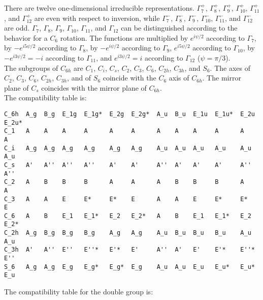 \documentclass[12pt,a4paper,twoside]{report}
\begin{document}
There are twelve one-dimensional irreducible representations. 
$\Gamma_7^+$, $\Gamma_8^+$, $\Gamma_9^+$, $\Gamma_{10}^+$, $\Gamma_{11}^+$,
and $\Gamma_{12}^+$ are even with respect to inversion, while 
$\Gamma_7^-$, $\Gamma_8^-$, $\Gamma_9^-$, $\Gamma_{10}^-$, $\Gamma_{11}^-$,
and $\Gamma_{12}^-$ are odd. $\Gamma_7$, $\Gamma_8$, $\Gamma_9$, 
$\Gamma_{10}$, $\Gamma_{11}$, and $\Gamma_{12}$ can be distinguished
according to the behavior for a $C_6$ rotation.
The functions are multiplied by $e^{i\psi/2}$ according to $\Gamma_7$, 
by $-e^{i5\psi/2}$ according to $\Gamma_8$, by $-e^{i\psi/2}$ according 
to $\Gamma_9$, $e^{i5\psi/2}$ according to $\Gamma_{10}$, by $-e^{i3\psi/2}=-i$ 
according to $\Gamma_{11}$, and $e^{i3\psi/2}=i$ according 
to $\Gamma_{12}$ ($\psi=\pi/3$). \\
The subgroups of $C_{6h}$ are $C_1$, $C_i$, $C_s$, $C_2$, $C_3$, $C_6$, 
$C_{2h}$, $C_{3h}$, and $S_6$. The axes of $C_2$, $C_3$, $C_6$, $C_{2h}$, 
$C_{3h}$, and of $S_6$ coincide with the $C_6$ axis of $C_{6h}$. The mirror 
plane of $C_s$ coincides with the mirror plane of $C_{6h}$.\\
The compatibility table is:
\begin{tcolorbox}
\begin{scriptsize}
\begin{verbatim}
C_6h  A_g  B_g  E_1g  E_1g*  E_2g  E_2g*  A_u  B_u  E_1u  E_1u*  E_2u  E_2u*
C_1   A    A    A     A      A     A      A    A    A     A      A     A
C_i   A_g  A_g  A_g   A_g    A_g   A_g    A_u  A_u  A_u   A_u    A_u   A_u
C_s   A'   A''  A''   A''    A'    A'     A''  A'   A'    A'     A''   A''
C_2   A    B    B     B      A     A      A    B    B     B      A     A
C_3   A    A    E     E*     E*    E      A    A    E     E*     E*    E
C_6   A    B    E_1   E_1*   E_2   E_2*   A    B    E_1   E_1*   E_2   E_2*
C_2h  A_g  B_g  B_g   B_g    A_g   A_g    A_u  B_u  B_u   B_u    A_u   A_u
C_3h  A'   A''  E''   E''*   E'*   E'     A''  A'   E'    E'*    E''*  E'' 
S_6   A_g  A_g  E_g   E_g*   E_g*  E_g    A_u  A_u  E_u   E_u*   E_u*  E_u
\end{verbatim}
\end{scriptsize}
\end{tcolorbox}

The compatibility table for the double group is:
\end{document}
